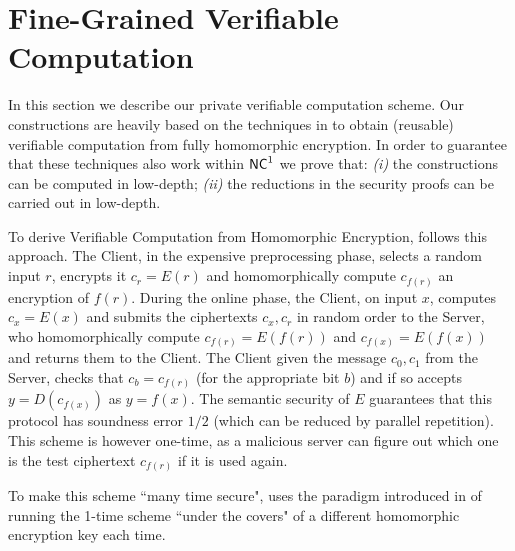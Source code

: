 \section{Fine-Grained Verifiable Computation}
\label{sec:vc}
\label{sec:VC}


In this section we describe our private verifiable computation scheme.
Our constructions are heavily based on the techniques in \cite{ckv10} to obtain (reusable) verifiable computation from fully homomorphic encryption.
In order to guarantee that these techniques also work within ${\mathsf{NC}}^1$  we prove that: \textit{(i)} the constructions can be computed in low-depth; \textit{(ii)} the reductions in the security proofs can be carried out in low-depth.

\medskip
{}
To derive Verifiable Computation from Homomorphic Encryption, \cite{ckv10} follows this approach. The Client, in the expensive preprocessing phase, selects a random input $r$, encrypts it $c_r=E(r)$ and homomorphically compute $c_{f(r)}$ an encryption of $f(r)$. During the online phase, the Client, on input $x$, computes $c_x=E(x)$ and submits
the ciphertexts $c_x,c_r$ in random order to the Server, who homomorphically compute 
$c_{f(r)}=E(f(r))$ and $c_{f(x)}=E(f(x))$ and returns them to the Client. The Client given the message $c_0,c_1$ from the Server, checks that $c_b=c_{f(r)}$ (for the appropriate bit $b$) and if so accepts $y=D(c_{f(x)})$ as $y=f(x)$. The semantic security of $E$ guarantees that this protocol has soundness error $1/2$ (which can be reduced by parallel repetition). This scheme is however one-time, as a malicious server can figure out 
which one is the test ciphertext $c_{f(r)}$ if it is used again. 

To make this scheme ``many time secure", \cite{ckv10} uses the paradigm introduced in 
\cite{ggp10} of running the 1-time scheme ``under the covers" of a different
homomorphic encryption key each time. 



